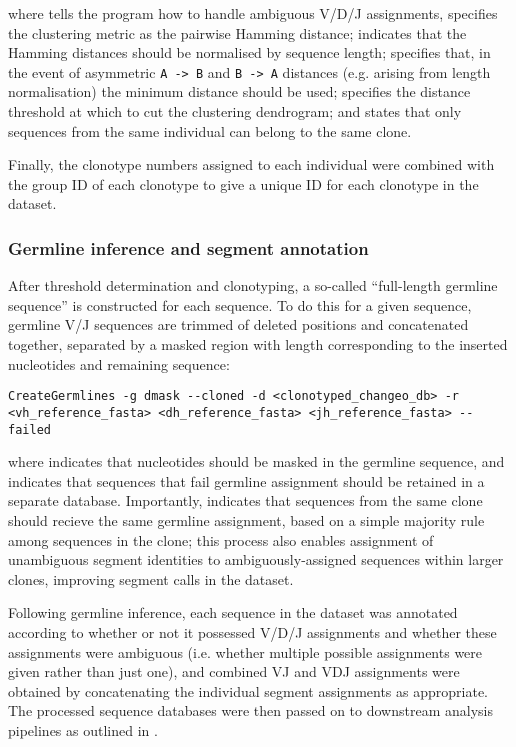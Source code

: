 \noindent where  tells the program how to handle ambiguous V/D/J assignments,  specifies the clustering metric as the pairwise Hamming distance;  indicates that the Hamming distances should be normalised by sequence length;  specifies that, in the event of asymmetric \texttt{A -> B} and \texttt{B -> A} distances (e.g. arising from length normalisation) the minimum distance should be used;  specifies the distance threshold at which to cut the clustering dendrogram; and  states that only sequences from the same individual can belong to the same clone.

Finally, the clonotype numbers assigned to each individual were combined with the group ID of each clonotype to give a unique ID for each clonotype in the dataset.

\subsubsection{Germline inference and segment annotation}
\label{sec:methods_comp_igpreproc_germ}

After threshold determination and clonotyping, a so-called ``full-length germline sequence'' is constructed for each sequence. To do this for a given sequence, germline V/J sequences are trimmed of deleted positions and concatenated together, separated by a masked region with length corresponding to the inserted nucleotides and remaining \dh sequence:

\begin{lstlisting}
CreateGermlines -g dmask --cloned -d <clonotyped_changeo_db> -r <vh_reference_fasta> <dh_reference_fasta> <jh_reference_fasta> --failed
\end{lstlisting}

\noindent where  indicates that \dh nucleotides should be masked in the germline sequence, and  indicates that sequences that fail germline assignment should be retained in a separate database. Importantly,  indicates that sequences from the same clone should recieve the same germline assignment, based on a simple majority rule among sequences in the clone; this process also enables assignment of unambiguous segment identities to ambiguously-assigned sequences within larger clones, improving segment calls in the dataset. 

Following germline inference, each sequence in the dataset was annotated according to whether or not it possessed V/D/J assignments and whether these assignments were ambiguous (i.e. whether multiple possible assignments were given rather than just one), and combined VJ and VDJ assignments were obtained by concatenating the individual segment assignments as appropriate. The processed sequence databases were then passed on to downstream analysis pipelines as outlined in .

